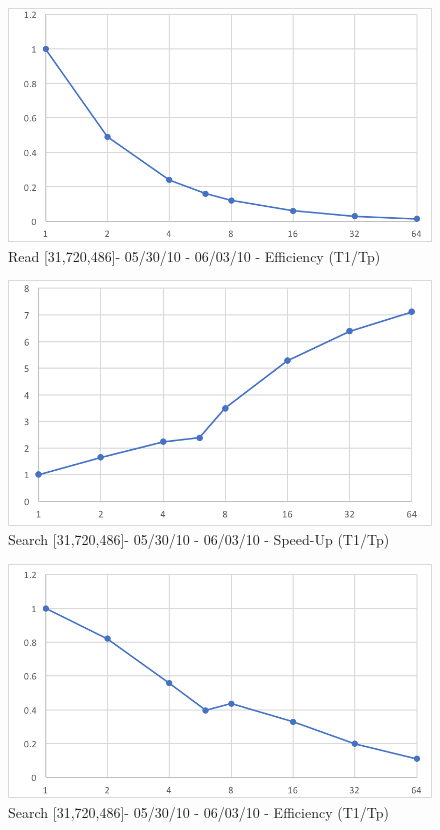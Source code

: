 \documentclass[12pt]{article} %
\begin{document}
\begin{figure}[htb]
\caption{Read [31,720,486]- 05/30/10 - 06/03/10 - Efficiency (T1/Tp)}\label{fig:benchmark01}
\centering
\includegraphics[width=15cm,keepaspectratio]{imgs/img14.png}
\end{figure} 

\begin{figure}[htb]
\caption{Search [31,720,486]- 05/30/10 - 06/03/10 - Speed-Up (T1/Tp)}\label{fig:benchmark01}
\centering
\includegraphics[width=15cm,keepaspectratio]{imgs/img15.png}
\end{figure} 

\begin{figure}[htb]
\caption{Search [31,720,486]- 05/30/10 - 06/03/10 - Efficiency (T1/Tp)}\label{fig:benchmark01}
\centering
\includegraphics[width=15cm,keepaspectratio]{imgs/img16.png}
\end{figure} 
\end{document}
